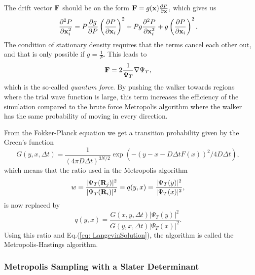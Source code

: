 \documentclass[../main.tex]{subfiles}
\begin{document}
The drift vector $\bf{F}$ should be on the form ${\bf F} = g({\bf x}) \frac{\partial P}{\partial {\bf x}}$, which gives us
\begin{equation}\label{stationaryFokkerF}
 \frac{\partial^2 P}{\partial {\bf x}_i^2} = P \frac{\partial g}{\partial P} \left(\frac{\partial P}{\partial {\bf x}_i}\right)^2 + Pg\frac{\partial^2 P}{\partial {\bf x}_i^2}
 + g\left(\frac{\partial P}{\partial {\bf x}_i}\right)^2.
\end{equation}
The condition of stationary density requires that the terms cancel each other out, and that is only possible if $g = \frac{1}{P}$. This leads to
\begin{equation}
 {\bf F} = 2 \frac{1}{\Psi_T} \nabla \Psi_T,
\end{equation}
which is the so-called \textit{quantum force}. By pushing the walker towards regions where the trial wave function is large, this term increases the efficiency of the simulation compared to the brute force Metropolis algorithm where the walker has the same probability of moving in every direction.

From the Fokker-Planck equation we get a transition probability given by the Green's function
\begin{equation}
    G(y, x, \Delta t) = \frac{1}{(4\pi D\Delta t)^{3N/2}}\exp(-(y - x - D\Delta tF(x))^2/4D\Delta t),
\end{equation}
which means that the ratio used in the Metropolis algorithm
\begin{equation}\label{ratio3}
 w = \frac{|\Psi_T({\bf R}_j)|^2}{|\Psi_T({\bf R}_i)|^2} = q(y, x) = \frac{|\Psi_T(y)|^2}{|\Psi_T(x)|^2},
\end{equation}
is now replaced by
\begin{equation}\label{ratio4}
    q(y, x) = \frac{G(x, y, \Delta t)|\Psi_T(y)|^2}{G(y, x, \Delta t)|\Psi_T(x)|^2}.
\end{equation}
Using this ratio and Eq.(\ref{eq: LangevinSolution}), the algorithm is called the Metropolis-Hastings algorithm.


\subsubsection{Metropolis Sampling with a Slater Determinant}
\end{document}
